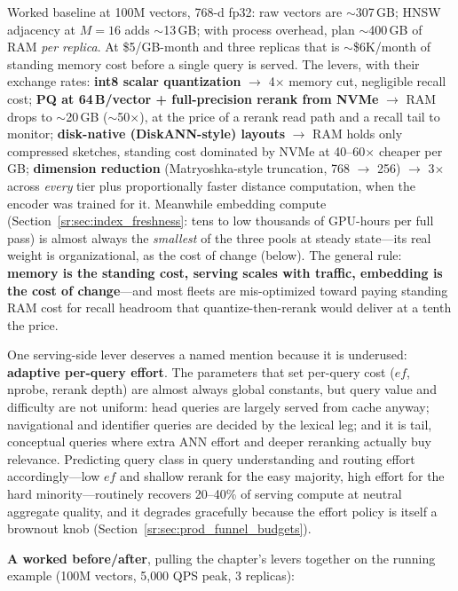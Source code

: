 Worked baseline at 100M vectors, 768-d fp32: raw vectors are $\sim$307\,GB; HNSW adjacency at $M{=}16$ adds $\sim$13\,GB; with process overhead, plan $\sim$400\,GB of RAM \textit{per replica}. At \$5/GB-month and three replicas that is $\sim$\$6K/month of standing memory cost before a single query is served. The levers, with their exchange rates: \textbf{int8 scalar quantization} $\to$ 4$\times$ memory cut, negligible recall cost; \textbf{PQ at 64\,B/vector + full-precision rerank from NVMe} $\to$ RAM drops to $\sim$20\,GB ($\sim$50$\times$), at the price of a rerank read path and a recall tail to monitor; \textbf{disk-native (DiskANN-style) layouts} $\to$ RAM holds only compressed sketches, standing cost dominated by NVMe at 40--60$\times$ cheaper per GB; \textbf{dimension reduction} (Matryoshka-style truncation, 768 $\to$ 256) $\to$ 3$\times$ across \textit{every} tier plus proportionally faster distance computation, when the encoder was trained for it. Meanwhile embedding compute (Section~\ref{sr:sec:index_freshness}: tens to low thousands of GPU-hours per full pass) is almost always the \textit{smallest} of the three pools at steady state---its real weight is organizational, as the cost of change (below). The general rule: \textbf{memory is the standing cost, serving scales with traffic, embedding is the cost of change}---and most fleets are mis-optimized toward paying standing RAM cost for recall headroom that quantize-then-rerank would deliver at a tenth the price.

One serving-side lever deserves a named mention because it is underused: \textbf{adaptive per-query effort}. The parameters that set per-query cost ($ef$, nprobe, rerank depth) are almost always global constants, but query value and difficulty are not uniform: head queries are largely served from cache anyway; navigational and identifier queries are decided by the lexical leg; and it is tail, conceptual queries where extra ANN effort and deeper reranking actually buy relevance. Predicting query class in query understanding and routing effort accordingly---low $ef$ and shallow rerank for the easy majority, high effort for the hard minority---routinely recovers 20--40\% of serving compute at neutral aggregate quality, and it degrades gracefully because the effort policy is itself a brownout knob (Section~\ref{sr:sec:prod_funnel_budgets}).

\textbf{A worked before/after}, pulling the chapter's levers together on the running example (100M vectors, 5{,}000 QPS peak, 3 replicas):

